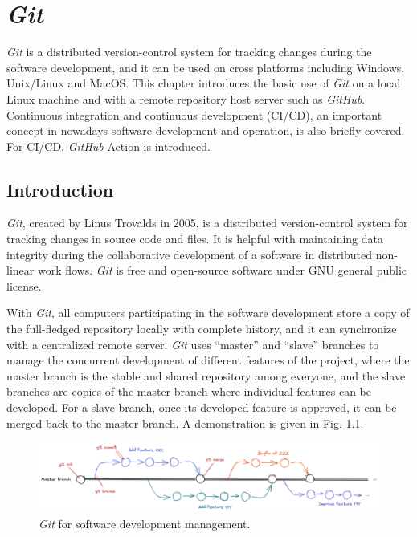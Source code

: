 \chapter{\textit{Git}}

\textit{Git} is a distributed version-control system for tracking changes during the software development, and it can be used on cross platforms including Windows, Unix/Linux and MacOS. This chapter introduces the basic use of \textit{Git} on a local Linux machine and with a remote repository host server such as \textit{GitHub}. Continuous integration and continuous development (CI/CD), an important concept in nowadays software development and operation, is also briefly covered. For CI/CD, \textit{GitHub} Action is introduced.

\section{Introduction}

\textit{Git}, created by Linus Trovalds in 2005, is a distributed version-control system for tracking changes in source code and files. It is helpful with maintaining data integrity during the collaborative development of a software in distributed non-linear work flows. \textit{Git} is free and open-source software under GNU general public license.

With \textit{Git}, all computers participating in the software development store a copy of the full-fledged repository locally with complete history, and it can synchronize with a centralized remote server. \textit{Git} uses ``master'' and ``slave'' branches to manage the concurrent development of different features of the project, where the master branch is the stable and shared repository among everyone, and the slave branches are copies of the master branch where individual features can be developed. For a slave branch, once its developed feature is approved, it can be merged back to the master branch. A demonstration is given in Fig. \ref{ch:sma:fig:gitflow}.
\begin{figure}[htbp]
	\centering
	\includegraphics[width=350pt]{chapters/part-3/figures/gitflow.png}
	\caption{\textit{Git} for software development management.} \label{ch:sma:fig:gitflow}
\end{figure}

